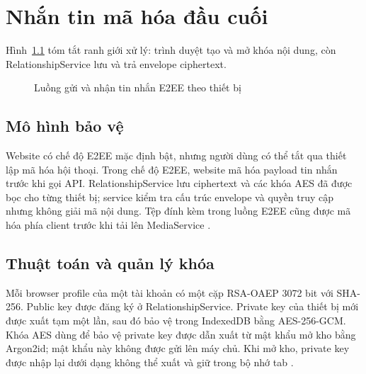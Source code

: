 \chapter{Nhắn tin mã hóa đầu cuối}\label{chap:e2ee}
Hình~\ref{fig:luong-e2ee} tóm tắt ranh giới xử lý: trình duyệt tạo và mở khóa nội dung, còn RelationshipService lưu và trả envelope ciphertext.

\begin{figure}[htbp]
\centering
{}
\caption{Luồng gửi và nhận tin nhắn E2EE theo thiết bị}
\label{fig:luong-e2ee}
\end{figure}
\section{Mô hình bảo vệ}
Website có chế độ E2EE mặc định bật, nhưng người dùng có thể tắt qua thiết lập mã hóa hội thoại. Trong chế độ E2EE, website mã hóa payload tin nhắn trước khi gọi API. RelationshipService lưu ciphertext và các khóa AES đã được bọc cho từng thiết bị; service kiểm tra cấu trúc envelope và quyền truy cập nhưng không giải mã nội dung. Tệp đính kèm trong luồng E2EE cũng được mã hóa phía client trước khi tải lên MediaService \cite{e2ee,relationship}.

\section{Thuật toán và quản lý khóa}
Mỗi browser profile của một tài khoản có một cặp RSA-OAEP 3072 bit với SHA-256. Public key được đăng ký ở RelationshipService. Private key của thiết bị mới được xuất tạm một lần, sau đó bảo vệ trong IndexedDB bằng AES-256-GCM. Khóa AES dùng để bảo vệ private key được dẫn xuất từ mật khẩu mở kho bằng Argon2id; mật khẩu này không được gửi lên máy chủ. Khi mở kho, private key được nhập lại dưới dạng không thể xuất và giữ trong bộ nhớ tab \cite{e2ee}.

